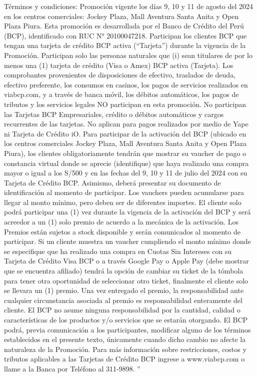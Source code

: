 Términos y condiciones: 
Promoción vigente los días 9, 10 y 11 de agosto del 2024 en los centros comerciales: Jockey Plaza, Mall Aventura Santa Anita y Open Plaza Piura. Esta promoción es desarrollada por el Banco de Crédito del Perú (BCP), identificado con RUC N° 20100047218. Participan los clientes BCP que tengan una tarjeta de crédito BCP activa (“Tarjeta”) durante la vigencia de la Promoción. Participan solo las personas naturales que (i) sean titulares de por lo menos una (1) tarjeta de crédito (Visa o Amex) BCP activa (Tarjeta). Los comprobantes provenientes de disposiciones de efectivo, traslados de deuda, efectivo preferente, los consumos en casinos, los pagos de servicios realizados en viabcp.com, y a través de banca móvil, los débitos automáticos, los pagos de tributos y los servicios legales NO participan en esta promoción. No participan las Tarjetas BCP Empresariales, crédito o débitos automáticos y cargos recurrentes de las tarjetas. No aplican para pagos realizados por medio de Yape ni Tarjeta de Crédito iO. Para participar de la activación del BCP (ubicado en los centros comerciales Jockey Plaza, Mall Aventura Santa Anita y Open Plaza Piura), los clientes obligatoriamente tendrán que mostrar su vaucher de pago o constancia virtual donde se aprecie (identifique) que haya realizado una compra mayor o igual a los S/500 y en las fechas del 9, 10 y 11 de julio del 2024 con su Tarjeta de Crédito BCP. Asimismo, deberá presentar su documento de identificación al momento de participar. Los vauchers pueden acumularse para llegar al monto mínimo, pero deben ser de diferentes importes. El cliente solo podrá participar una (1) vez durante la vigencia de la activación del BCP y será acreedor a un (1) solo premio de acuerdo a la mecánica de la activación. Los Premios están sujetos a stock disponible y serán comunicados al momento de participar. Si un cliente muestra un vaucher cumpliendo el monto mínimo donde se especifique que ha realizado una compra en Cuotas Sin Intereses con su Tarjeta de Crédito Visa BCP o a través Google Pay o Apple Pay (debe mostrar que se encuentra afiliado) tendrá la opción de cambiar su ticket de la tómbola para tener otra oportunidad de seleccionar otro ticket, finalmente el cliente solo se llevara un (1) premio. Una vez entregado el premio, la responsabilidad ante cualquier circunstancia asociada al premio es responsabilidad enteramente del cliente. El BCP no asume ninguna responsabilidad por la cantidad, calidad o características de los productos y/o servicios que se estarán otorgando. El BCP podrá, previa comunicación a los participantes, modificar alguno de los términos establecidos en el presente texto, únicamente cuando dicho cambio no afecte la naturaleza de la Promoción. Para más información sobre restricciones, costos y tributos aplicables a las Tarjetas de Crédito BCP ingrese a www.viabcp.com o llame a la Banca por Teléfono al 311-9898.
''

